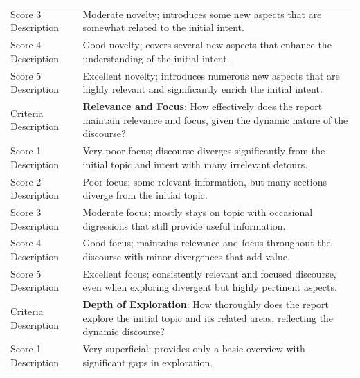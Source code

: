 \begin{tabular}{ll}
Score 3 Description  & Moderate novelty; introduces some new aspects that are somewhat related to the initial intent.                                                                                  \\
Score 4 Description  & Good novelty; covers several new aspects that enhance the understanding of the initial intent.                                                                                                                      \\
Score 5 Description  & Excellent novelty; introduces numerous new aspects that are highly relevant and significantly enrich the initial intent.                                                                             \\ 
\midrule
Criteria Description & \textbf{Relevance and Focus}: How effectively does the report maintain relevance and focus, given the dynamic nature of the discourse?                                                                  \\
Score 1 Description  & Very poor focus; discourse diverges significantly from the initial topic and intent with many irrelevant detours.                                                                                                \\
Score 2 Description  & Poor focus; some relevant information, but many sections diverge from the initial topic.                                                                     \\
Score 3 Description  & Moderate focus; mostly stays on topic with occasional digressions that still provide useful information.                                                                                                                                    \\
Score 4 Description  & Good focus; maintains relevance and focus throughout the discourse with minor divergences that add value.                                                                 \\
Score 5 Description  & Excellent focus; consistently relevant and focused discourse, even when exploring divergent but highly pertinent aspects.  \\ 
\midrule
Criteria Description & \textbf{Depth of Exploration}: How thoroughly does the report explore the initial topic and its related areas, reflecting the dynamic discourse?                                                                     \\
Score 1 Description  & Very superficial; provides only a basic overview with significant gaps in exploration.                                                                    \\

\end{tabular}
